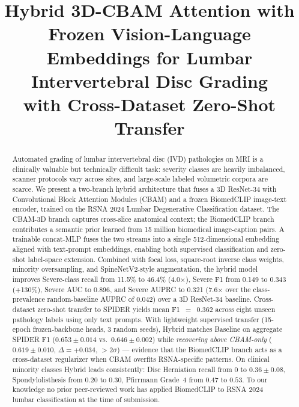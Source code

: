\documentclass[conference]{IEEEtran}
\begin{document}
\title{Hybrid 3D-CBAM Attention with Frozen Vision-Language\\
       Embeddings for Lumbar Intervertebral Disc Grading\\
       with Cross-Dataset Zero-Shot Transfer}

\author{
        }

\maketitle

\begin{abstract}
Automated grading of lumbar intervertebral disc (IVD) pathologies on MRI is
a clinically valuable but technically difficult task: severity classes are
heavily imbalanced, scanner protocols vary across sites, and large-scale
labeled volumetric corpora are scarce. We present a two-branch hybrid
architecture that fuses a 3D ResNet-34 with Convolutional Block Attention
Modules (CBAM) and a frozen BiomedCLIP image-text encoder, trained on
the RSNA 2024 Lumbar Degenerative Classification dataset. The CBAM-3D
branch captures cross-slice anatomical context; the BiomedCLIP branch
contributes a semantic prior learned from 15 million biomedical
image-caption pairs. A trainable concat-MLP fuses the two streams into a
single 512-dimensional embedding aligned with text-prompt embeddings,
enabling both supervised classification and zero-shot label-space
extension. Combined with focal loss, square-root inverse class weights,
minority oversampling, and SpineNetV2-style augmentation, the hybrid
model improves Severe-class recall from 11.5\% to 46.4\% (4.0$\times$),
Severe F1 from 0.149 to 0.343 (+130\%), Severe AUC to 0.896, and Severe
AUPRC to 0.321 (7.6$\times$ over the class-prevalence random-baseline
AUPRC of 0.042) over a 3D ResNet-34 baseline. Cross-dataset
zero-shot transfer to SPIDER yields mean F1~$=$~0.362 across eight
unseen pathology labels using only text prompts. With lightweight
supervised transfer (15-epoch frozen-backbone heads, 3 random seeds),
Hybrid matches Baseline on aggregate SPIDER F1 ($0.653 \pm 0.014$
vs.\ $0.646 \pm 0.002$) while \emph{recovering above CBAM-only}
($0.619 \pm 0.010$, $\Delta = +0.034$, $> 2\sigma$) --- evidence that
the BiomedCLIP branch acts as a cross-dataset regularizer when CBAM
overfits RSNA-specific patterns. On clinical minority classes Hybrid
leads consistently: Disc Herniation recall from $0$ to $0.36 \pm
0.08$, Spondylolisthesis from $0.20$ to $0.30$, Pfirrmann Grade~4
from $0.47$ to $0.53$. To our knowledge no prior peer-reviewed
work has applied BiomedCLIP to RSNA 2024 lumbar classification at
the time of submission.
\end{abstract}
\end{document}
